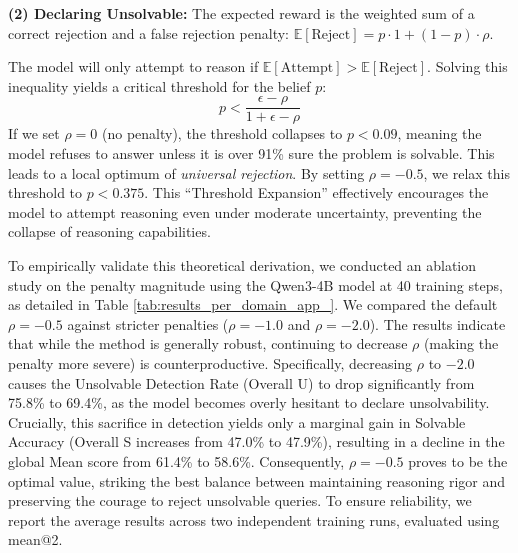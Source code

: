 \textbf{(2) Declaring Unsolvable:} The expected reward is the weighted sum of a correct rejection and a false rejection penalty: $\mathbb{E}[\text{Reject}] = p \cdot 1 + (1-p) \cdot \rho$.

The model will only attempt to reason if $\mathbb{E}[\text{Attempt}] > \mathbb{E}[\text{Reject}]$. Solving this inequality yields a critical threshold for the belief $p$:
\[
p < \frac{\epsilon - \rho}{1 + \epsilon - \rho}
\]
If we set $\rho=0$ (no penalty), the threshold collapses to $p < 0.09$, meaning the model refuses to answer unless it is over 91\% sure the problem is solvable. This leads to a local optimum of \textit{universal rejection}. By setting $\rho = -0.5$, we relax this threshold to $p < 0.375$. This ``Threshold Expansion'' effectively encourages the model to attempt reasoning even under moderate uncertainty, preventing the collapse of reasoning capabilities.

To empirically validate this theoretical derivation, we conducted an ablation study on the penalty magnitude using the Qwen3-4B model at 40 training steps, as detailed in Table \ref{tab:results_per_domain_app_}. We compared the default $\rho = -0.5$ against stricter penalties ($\rho = -1.0$ and $\rho = -2.0$). The results indicate that while the method is generally robust, continuing to decrease $\rho$ (making the penalty more severe) is counterproductive. Specifically, decreasing $\rho$ to $-2.0$ causes the Unsolvable Detection Rate (Overall U) to drop significantly from 75.8\% to 69.4\%, as the model becomes overly hesitant to declare unsolvability. Crucially, this sacrifice in detection yields only a marginal gain in Solvable Accuracy (Overall S increases from 47.0\% to 47.9\%), resulting in a decline in the global Mean score from 61.4\% to 58.6\%. Consequently, $\rho = -0.5$ proves to be the optimal value, striking the best balance between maintaining reasoning rigor and preserving the courage to reject unsolvable queries. To ensure reliability, we report the average results across two independent training runs, evaluated using mean@2.

